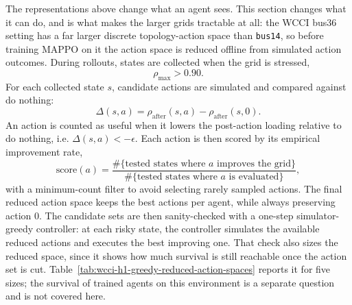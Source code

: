 The representations above change what an agent sees. This section changes what
it can do, and is what makes the larger grids tractable at all: the WCCI bus36
setting has a far larger discrete topology-action space than \texttt{bus14}, so
before training MAPPO on it the action space is reduced offline from simulated
action outcomes. During rollouts, states are collected
when the grid is stressed,
\[
  \rho_{\max}>0.90.
\]
For each collected state \(s\), candidate actions are simulated and compared
against do nothing:
\[
  \Delta(s,a)=\rho_{\mathrm{after}}(s,a)
  -\rho_{\mathrm{after}}(s,0).
\]
An action is counted as useful when it lowers the post-action loading relative
to do nothing, i.e. \(\Delta(s,a)<-\epsilon\). Each action is then scored by its
empirical improvement rate,
\[
  \mathrm{score}(a)=
  \frac{\#\{\text{tested states where }a\text{ improves the grid}\}}
       {\#\{\text{tested states where }a\text{ is evaluated}\}},
\]
with a minimum-count filter to avoid selecting rarely sampled actions. The final
reduced action space keeps the best actions per agent, while always preserving
action \(0\). The candidate sets are then sanity-checked with a one-step
simulator-greedy controller: at each risky state, the controller simulates the
available reduced actions and executes the best improving one. That check also
sizes the reduced space, since it shows how much survival is still reachable
once the action set is cut. Table~\ref{tab:wcci-h1-greedy-reduced-action-spaces}
reports it for five sizes; the survival of trained agents on this environment is
a separate question and is not covered here.

\begin{table}[htbp]
  \centering
  \small
  \caption{One-step greedy evaluation of WCCI reduced action spaces on 50
  random test chronics. All rows use the same chronic sample
  (\texttt{chronic\_sample\_seed=0}); the do-nothing mean survival on this
  sample is \(28.30\%\).}
  \label{tab:wcci-h1-greedy-reduced-action-spaces}
  \setlength{\tabcolsep}{4pt}
\end{table}

